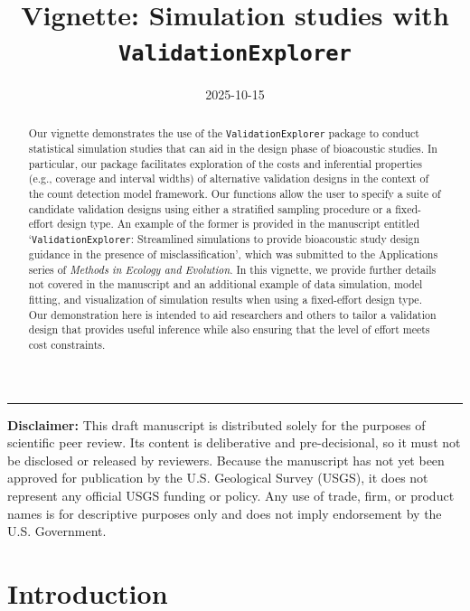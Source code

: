 \documentclass[
]{article}
\title{Vignette: Simulation studies with \texttt{ValidationExplorer}}
\author{}
\date{\vspace{-2.5em}2025-10-15}
\begin{document}
\maketitle
\begin{abstract}
Our vignette demonstrates the use of the \texttt{ValidationExplorer} package to conduct statistical simulation studies that can aid in the design phase of bioacoustic studies. In particular, our package facilitates exploration of the costs and inferential properties (e.g., coverage and interval widths) of alternative validation designs in the context of the count detection model framework. Our functions allow the user to specify a suite of candidate validation designs using either a stratified sampling procedure or a fixed-effort design type. An example of the former is provided in the manuscript entitled `\texttt{ValidationExplorer}: Streamlined simulations to provide bioacoustic study design guidance in the presence of misclassification', which was submitted to the Applications series of \emph{Methods in Ecology and Evolution}. In this vignette, we provide further details not covered in the manuscript and an additional example of data simulation, model fitting, and visualization of simulation results when using a fixed-effort design type. Our demonstration here is intended to aid researchers and others to tailor a validation design that provides useful inference while also ensuring that the level of effort meets cost constraints. \vfill
\end{abstract}

\begin{center}\rule{0.5\linewidth}{0.5pt}\end{center}

\textbf{Disclaimer:} This draft manuscript is distributed solely for the purposes of scientific peer review. Its content is deliberative and pre-decisional, so it must not be disclosed or released by reviewers. Because the manuscript has not yet been approved for publication by the U.S. Geological Survey (USGS), it does not represent any official USGS funding or policy. Any use of trade, firm, or product names is for descriptive purposes only and does not imply endorsement by the U.S. Government.

\newpage

\setcounter{tocdepth}{4}
\tableofcontents

\newpage

\doublespacing

\section{Introduction}\label{introduction}
\end{document}
